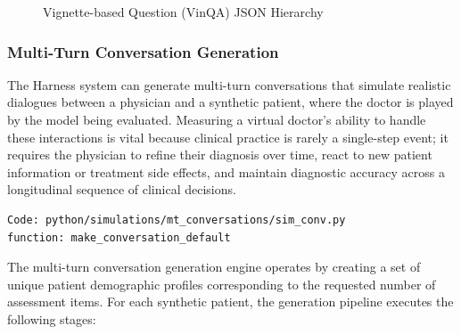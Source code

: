 \begin{figure}[H]
\caption{Vignette-based Question (VinQA) JSON Hierarchy}
\label{fig:vinqa_json_structure}
\end{figure}


\subsubsection{Multi-Turn Conversation Generation}
The Harness system can generate multi-turn conversations that simulate realistic dialogues between a physician and a synthetic patient, where the doctor is played by the model being evaluated. Measuring a virtual doctor’s ability to handle these interactions is vital because clinical practice is rarely a single-step event; it requires the physician to refine their diagnosis over time, react to new patient information or treatment side effects, and maintain diagnostic accuracy across a longitudinal sequence of clinical decisions.

\begin{verbatim}
Code: python/simulations/mt_conversations/sim_conv.py
function: make_conversation_default
\end{verbatim}

The multi-turn conversation generation engine operates by creating a set of unique patient demographic profiles corresponding to the requested number of assessment items. For each synthetic patient, the generation pipeline executes the following stages:

